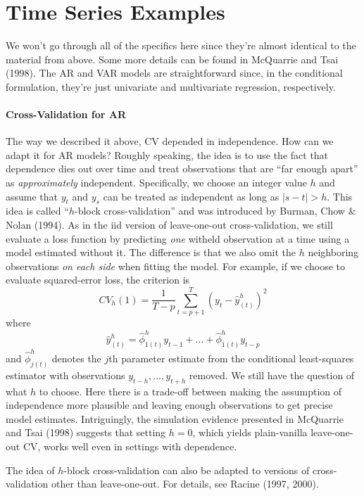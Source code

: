 \documentclass[12pt]{article}
\theoremstyle{definition}
\begin{document}
\section{Time Series Examples}
We won't go through all of the specifics here since they're almost identical to the material from above. Some more details can be found in
McQuarrie and Tsai (1998). The AR and VAR models are straightforward since, in the conditional formulation, they're just univariate and multivariate regression, respectively.



\paragraph{Cross-Validation for AR}
The way we described it above, CV depended in independence. How can we adapt it for AR models? Roughly speaking, the idea is to use the fact that dependence dies out over time and treat observations that are ``far enough apart'' as \emph{approximately} independent. Specifically, we choose an integer value $h$ and assume that $y_t$ and $y_s$ can be treated as independent as long as $|s - t|>h$. This idea is called ``$h$-block cross-validation'' and was introduced by Burman, Chow \& Nolan (1994). As in the iid version of leave-one-out cross-validation, we still evaluate a loss function by predicting \emph{one} witheld observation at a time using a model estimated without it. The difference is that we also omit the $h$ neighboring observations \emph{on each side} when fitting the model. For example, if we choose to evaluate squared-error loss, the criterion is
	$$CV_h(1) = \frac{1}{T-p}\sum_{t = p+1}^T \left(y_t - \hat{y}_{(t)}^h\right)^2$$
where 
$$\hat{y}^h_{(t)} = \hat{\phi}^h_{1(t)} y_{t-1} + \hdots + \hat{\phi}^h_{1(t)}y_{t-p}$$
and $\hat{\phi}^h_{j(t)}$ denotes the $j$th parameter estimate from the conditional least-squares estimator with observations $y_{t-h}, \hdots,  y_{t+h}$ removed. We still have the question of what $h$ to choose. Here there is a trade-off between making the assumption of independence more plausible and leaving enough observations to get precise model estimates. Intriguingly, the simulation evidence presented in McQuarrie and Tsai (1998) suggests that setting $h=0$, which yields plain-vanilla leave-one-out CV, works well even in settings with dependence.

The idea of $h$-block cross-validation can also be adapted to versions of cross-validation other than leave-one-out. For details, see Racine (1997, 2000).
\end{document}
